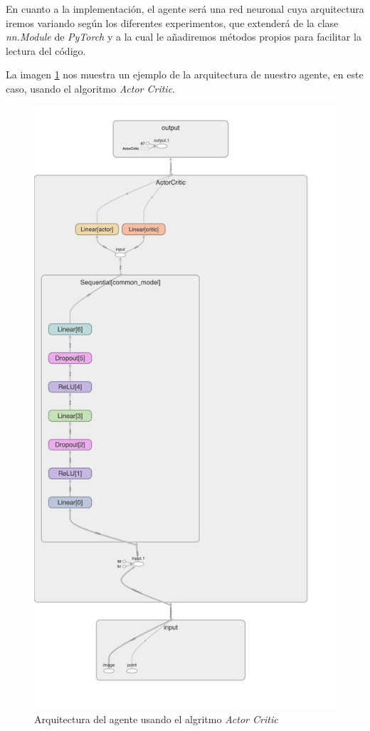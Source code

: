 En cuanto a la implementación, el agente será una red neuronal cuya arquitectura iremos variando según los diferentes experimentos, que extenderá de la clase \textit{nn.Module} de \textit{PyTorch} y a la cual le añadiremos métodos propios para facilitar la lectura del código.
\medskip

La imagen \ref{fig-agent-actor-critic} nos muestra un ejemplo de la arquitectura de nuestro agente, en este caso, usando el algoritmo \textit{Actor Critic}.
\medskip

\begin{figure}[ht!]
    \centering
    \includegraphics[scale=.2]{figuras/Actor-Critic-ac-dropout-model.png}
    \caption[Arquitectura del agente usando el algritmo \textit{Actor Critic}]{Arquitectura del agente usando el algritmo \textit{Actor Critic} }
    \label{fig-agent-actor-critic}
\end{figure}

